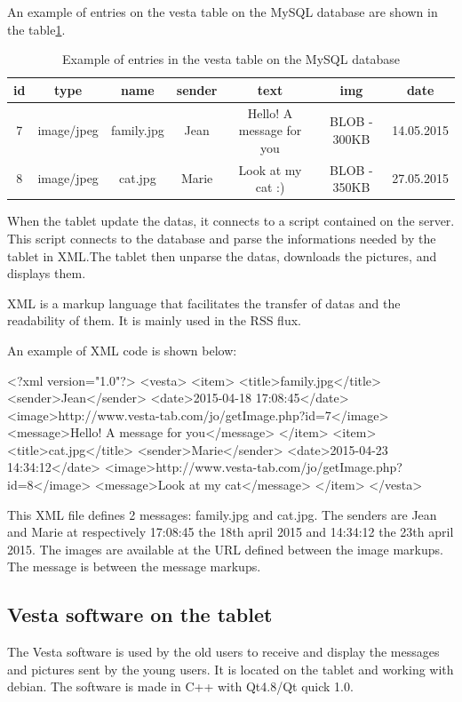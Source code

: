 An example of entries on the vesta table on the MySQL database are shown in the table\ref{tab:database}.

\begin{table}
\begin{tabular}{|c|c|c|c|c|c|c|}
  \hline
  id & type & name & sender & text & img & date \\
  \hline
  7 & image/jpeg & family.jpg & Jean & Hello! A message for you & BLOB - 300KB & 14.05.2015\\
  8 & image/jpeg & cat.jpg & Marie & Look at my cat :) & BLOB - 350KB & 27.05.2015\\
  \hline
\end{tabular}
\caption {Example of entries in the vesta table on the MySQL database}\label{tab:database}
\end{table}

When the tablet update the datas, it connects to a script contained on the server. This script connects to the database and parse the informations needed by the tablet in XML.The tablet then unparse the datas, downloads the pictures, and displays them.

XML is a markup language that facilitates the transfer of datas and the readability of them. It is mainly used in the RSS flux.


An example of XML code is shown below:

<?xml version="1.0"?>
<vesta>
  <item>
    <title>family.jpg</title>
    <sender>Jean</sender>
    <date>2015-04-18 17:08:45</date>    
    <image>http://www.vesta-tab.com/jo/getImage.php?id=7</image>
    <message>Hello! A message for you</message>
  </item>
  <item>
    <title>cat.jpg</title>
    <sender>Marie</sender>
    <date>2015-04-23 14:34:12</date>
    <image>http://www.vesta-tab.com/jo/getImage.php?id=8</image>
    <message>Look at my cat</message>
  </item>
</vesta>

This XML file defines 2 messages: family.jpg and cat.jpg. The senders are Jean and Marie at respectively 17:08:45 the 18th april 2015 and 14:34:12 the 23th april 2015. The images are available at the URL defined between the image markups. The message is between the message markups.

\clearpage

\subsection{Vesta software on the tablet}
The Vesta software is used by the old users to receive and display the messages and pictures sent by the young users. It is located on the tablet and working with debian. The software is made in C++ with Qt4.8/Qt quick 1.0.

